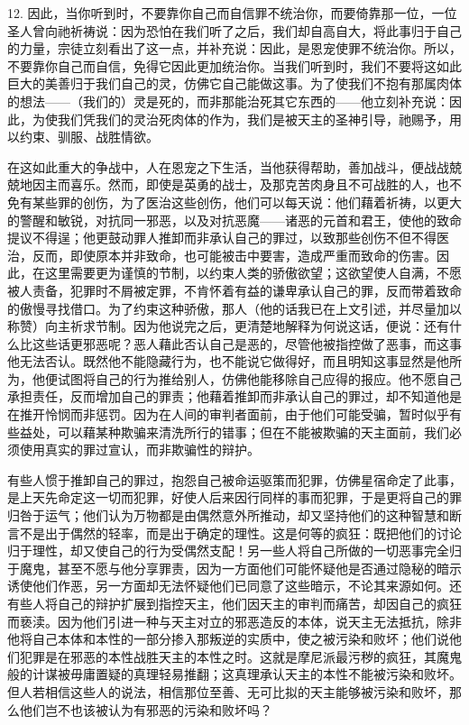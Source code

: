 12. 因此，当你听到时，不要靠你自己而自信罪不统治你，而要倚靠那一位，一位圣人曾向祂祈祷说：因为恐怕在我们听了之后，我们却自高自大，将此事归于自己的力量，宗徒立刻看出了这一点，并补充说：因此，是恩宠使罪不统治你。所以，不要靠你自己而自信，免得它因此更加统治你。当我们听到时，我们不要将这如此巨大的美善归于我们自己的灵，仿佛它自己能做这事。为了使我们不抱有那属肉体的想法——（我们的）灵是死的，而非那能治死其它东西的——他立刻补充说：因此，为使我们凭我们的灵治死肉体的作为，我们是被天主的圣神引导，祂赐予，用以约束、驯服、战胜情欲。\par

在这如此重大的争战中，人在恩宠之下生活，当他获得帮助，善加战斗，便战战兢兢地因主而喜乐。然而，即使是英勇的战士，及那克苦肉身且不可战胜的人，也不免有某些罪的创伤，为了医治这些创伤，他们可以每天说：他们藉着祈祷，以更大的警醒和敏锐，对抗同一邪恶，以及对抗恶魔——诸恶的元首和君王，使他的致命提议不得逞；他更鼓动罪人推卸而非承认自己的罪过，以致那些创伤不但不得医治，反而，即使原本并非致命，也可能被击中要害，造成严重而致命的伤害。因此，在这里需要更为谨慎的节制，以约束人类的骄傲欲望；这欲望使人自满，不愿被人责备，犯罪时不屑被定罪，不肯怀着有益的谦卑承认自己的罪，反而带着致命的傲慢寻找借口。为了约束这种骄傲，那人（他的话我已在上文引述，并尽量加以称赞）向主祈求节制。因为他说完之后，更清楚地解释为何说这话，便说：还有什么比这些话更邪恶呢？恶人藉此否认自己是恶的，尽管他被指控做了恶事，而这事他无法否认。既然他不能隐藏行为，也不能说它做得好，而且明知这事显然是他所为，他便试图将自己的行为推给别人，仿佛他能移除自己应得的报应。他不愿自己承担责任，反而增加自己的罪责；他藉着推卸而非承认自己的罪过，却不知道他是在推开怜悯而非惩罚。因为在人间的审判者面前，由于他们可能受骗，暂时似乎有些益处，可以藉某种欺骗来清洗所行的错事；但在不能被欺骗的天主面前，我们必须使用真实的罪过宣认，而非欺骗性的辩护。\par

有些人惯于推卸自己的罪过，抱怨自己被命运驱策而犯罪，仿佛星宿命定了此事，是上天先命定这一切而犯罪，好使人后来因行同样的事而犯罪，于是更将自己的罪归咎于运气；他们认为万物都是由偶然意外所推动，却又坚持他们的这种智慧和断言不是出于偶然的轻率，而是出于确定的理性。这是何等的疯狂：既把他们的讨论归于理性，却又使自己的行为受偶然支配！另一些人将自己所做的一切恶事完全归于魔鬼，甚至不愿与他分享罪责，因为一方面他们可能怀疑他是否通过隐秘的暗示诱使他们作恶，另一方面却无法怀疑他们已同意了这些暗示，不论其来源如何。还有些人将自己的辩护扩展到指控天主，他们因天主的审判而痛苦，却因自己的疯狂而亵渎。因为他们引进一种与天主对立的邪恶造反的本体，说天主无法抵抗，除非他将自己本体和本性的一部分掺入那叛逆的实质中，使之被污染和败坏；他们说他们犯罪是在邪恶的本性战胜天主的本性之时。这就是摩尼派最污秽的疯狂，其魔鬼般的计谋被毋庸置疑的真理轻易推翻；这真理承认天主的本性不能被污染和败坏。但人若相信这些人的说法，相信那位至善、无可比拟的天主能够被污染和败坏，那么他们岂不也该被认为有邪恶的污染和败坏吗？\par

